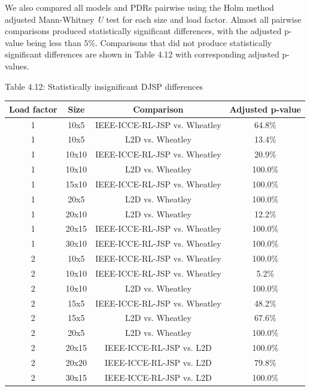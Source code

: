 We also compared all models and PDRs pairwise using the Holm method adjusted Mann-Whitney \textit{U} test \cite{mannwhitneyutest} for each size and load factor. Almost all pairwise comparisons produced statistically significant differences, with the adjusted p-value being less than $5\%$. Comparisons that did not produce statistically significant differences are shown in Table 4.12 with corresponding adjusted p-values.

\begin{table}
    Table 4.12: Statistically insignificant DJSP differences\\
    \vspace{1mm}
    \label{table:4.9}
    \begin{tabular}{cccc}
        \toprule
        Load factor & Size & Comparison & Adjusted p-value \\
        \midrule
        1 & 10x5 & IEEE-ICCE-RL-JSP vs. Wheatley & 64.8$\%$ \\
        1 & 10x5 & L2D vs. Wheatley & 13.4$\%$ \\
        1 & 10x10 & IEEE-ICCE-RL-JSP vs. Wheatley & 20.9$\%$ \\
        1 & 10x10 & L2D vs. Wheatley & 100.0$\%$ \\
        1 & 15x10 & IEEE-ICCE-RL-JSP vs. Wheatley & 100.0$\%$ \\
        1 & 20x5 & L2D vs. Wheatley & 100.0$\%$ \\
        1 & 20x10 & L2D vs. Wheatley & 12.2$\%$ \\
        1 & 20x15 & IEEE-ICCE-RL-JSP vs. Wheatley & 100.0$\%$ \\
        1 & 30x10 & IEEE-ICCE-RL-JSP vs. Wheatley & 100.0$\%$ \\\hline
        2 & 10x5 & IEEE-ICCE-RL-JSP vs. Wheatley & 100.0$\%$ \\
        2 & 10x10 & IEEE-ICCE-RL-JSP vs. Wheatley & 5.2$\%$ \\
        2 & 10x10 & L2D vs. Wheatley & 100.0$\%$ \\
        2 & 15x5 & IEEE-ICCE-RL-JSP vs. Wheatley & 48.2$\%$ \\
        2 & 15x5 & L2D vs. Wheatley & 67.6$\%$ \\
        2 & 20x5 & L2D vs. Wheatley & 100.0$\%$ \\
        2 & 20x15 & IEEE-ICCE-RL-JSP vs. L2D & 100.0$\%$ \\
        2 & 20x20 & IEEE-ICCE-RL-JSP vs. L2D & 79.8$\%$ \\
        2 & 30x15 & IEEE-ICCE-RL-JSP vs. L2D & 100.0$\%$ \\

\end{tabular}
\end{table}
